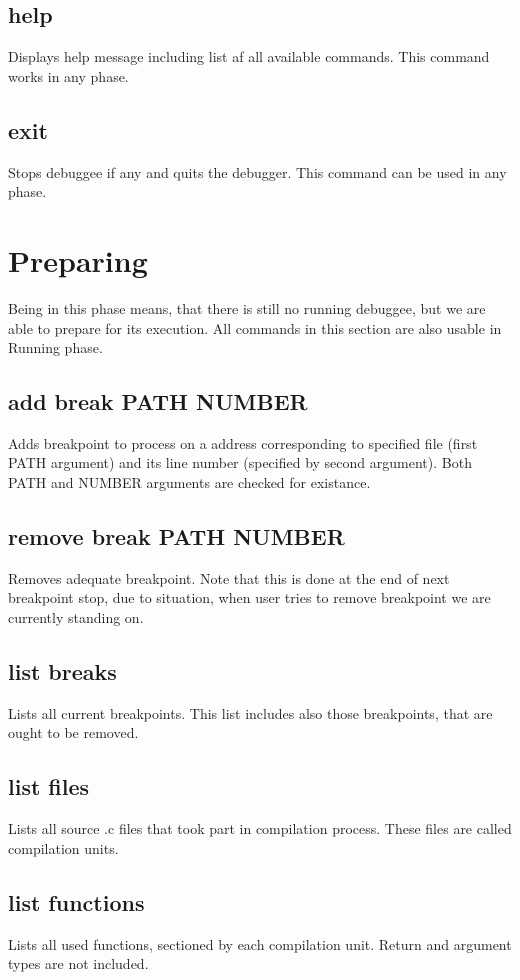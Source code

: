 \documentclass{article}
\begin{document}
	\subsection{help}
	Displays help message including list af all available commands. This command works in any phase.	
	
	\subsection{exit}
	Stops debuggee if any and quits the debugger. This command can be used in any phase.

	\pagebreak
	\section{Preparing}
	Being in this phase means, that there is still no running debuggee, but we are able to prepare for its execution. All commands in this section are also usable in Running phase.	
	
	\subsection{add break PATH NUMBER}
	Adds breakpoint to process on a address corresponding to specified file (first PATH argument) and its line number (specified by second argument). Both PATH and NUMBER arguments are checked for existance.
	
	\subsection{remove break PATH NUMBER}
	Removes adequate breakpoint. Note that this is done at the end of next breakpoint stop, due to situation, when user tries to remove breakpoint we are currently standing on.
	
	\subsection{list breaks}
	Lists all current breakpoints. This list includes also those breakpoints, that are ought to be removed.	
	
	\subsection{list files}
	Lists all source .c files that took part in compilation process. These files are called compilation units.	
	
	\subsection{list functions}
	Lists all used functions, sectioned by each compilation unit. Return and argument types are not included.
\end{document}
